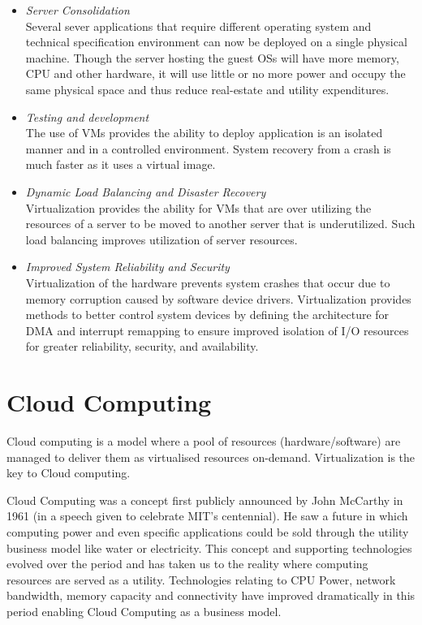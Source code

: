 \documentclass[12pt,a4paper]{report}
\begin{document}
\begin{itemize}
  
\item \emph{Server Consolidation} \\
Several sever applications that require different operating system and technical specification 
environment can now be deployed on a single physical machine. Though the server hosting the guest 
OSs will have more memory, CPU and other hardware, it will use little or no more power and occupy 
the same physical space and thus reduce real-estate and utility expenditures.

\item \emph{Testing and development} \\
The use of VMs provides the ability to deploy application is an isolated manner and
in a controlled environment. System recovery from a crash is much faster as it uses a virtual
image.

\item \emph{Dynamic Load Balancing and Disaster Recovery} \\
Virtualization provides the ability for VMs that are over utilizing  the resources of a server to be moved to 
another server that is underutilized. Such load balancing improves utilization of server resources.

\item \emph{Improved System Reliability and Security} \\
Virtualization of the hardware prevents system crashes that occur due to memory corruption caused by 
software device drivers. Virtualization provides methods to better control system devices by defining the
architecture for DMA and interrupt remapping to ensure improved isolation of I/O resources for greater
reliability, security, and availability.
\end{itemize}

\section{Cloud Computing}

Cloud computing is a model where a pool of resources (hardware/software) are
managed to deliver them as virtualised resources on-demand. Virtualization is the key
to Cloud computing.


Cloud Computing was a concept first publicly announced by John McCarthy in 1961 
(in a speech given to celebrate MIT's centennial). He saw a future in which computing 
power and even specific applications could be sold through the utility 
business model like water or electricity\cite{garfinkel1999architects}.
This concept and  supporting technologies evolved over the period and has taken us 
to the reality where computing resources are served as a utility. 
Technologies relating to CPU Power, network bandwidth, memory capacity 
and connectivity have improved dramatically in this period enabling Cloud Computing as 
a business model.
\end{document}
